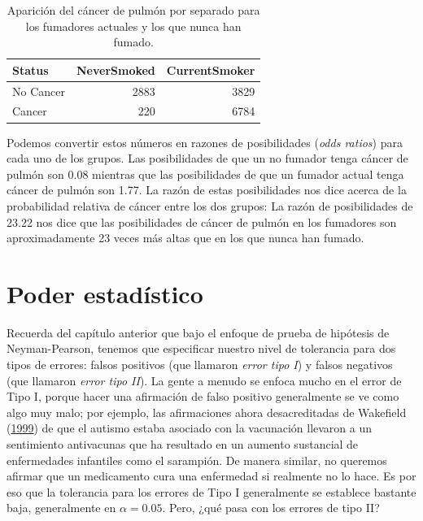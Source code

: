 \documentclass[
  12pt,
]{book}
\begin{document}
\begin{table}

\caption{\label{tab:unnamed-chunk-52}Aparición del cáncer de pulmón por separado para los fumadores actuales y los que nunca han fumado.}
\centering
\begin{tabular}[t]{l|r|r}
\hline
Status & NeverSmoked & CurrentSmoker\\
\hline
No Cancer & 2883 & 3829\\
\hline
Cancer & 220 & 6784\\
\hline
\end{tabular}
\end{table}

Podemos convertir estos números en razones de posibilidades (\emph{odds ratios}) para cada uno de los grupos. Las posibilidades de que un no fumador tenga cáncer de pulmón son 0.08 mientras que las posibilidades de que un fumador actual tenga cáncer de pulmón son 1.77. La razón de estas posibilidades nos dice acerca de la probabilidad relativa de cáncer entre los dos grupos: La razón de posibilidades de 23.22 nos dice que las posibilidades de cáncer de pulmón en los fumadores son aproximadamente 23 veces más altas que en los que nunca han fumado.

\hypertarget{statistical-power}{%
\section{Poder estadístico}\label{statistical-power}}

Recuerda del capítulo anterior que bajo el enfoque de prueba de hipótesis de Neyman-Pearson, tenemos que especificar nuestro nivel de tolerancia para dos tipos de errores: falsos positivos (que llamaron \emph{error tipo I}) y falsos negativos (que llamaron \emph{error tipo II}). La gente a menudo se enfoca mucho en el error de Tipo I, porque hacer una afirmación de falso positivo generalmente se ve como algo muy malo; por ejemplo, las afirmaciones ahora desacreditadas de Wakefield (\protect\hyperlink{ref-wake:1999}{1999}) de que el autismo estaba asociado con la vacunación llevaron a un sentimiento antivacunas que ha resultado en un aumento sustancial de enfermedades infantiles como el sarampión. De manera similar, no queremos afirmar que un medicamento cura una enfermedad si realmente no lo hace. Es por eso que la tolerancia para los errores de Tipo I generalmente se establece bastante baja, generalmente en \(\alpha = 0.05\). Pero, ¿qué pasa con los errores de tipo II?
\end{document}

